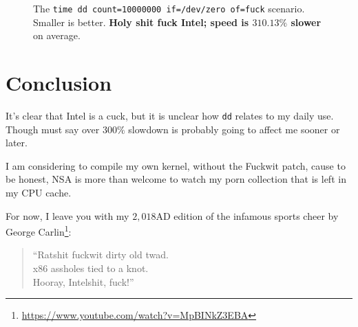 \documentclass[12pt,a4paper,onecolumn, openright]{article}
\begin{document}
\begin{figure}[h]
\centering
\caption{The \texttt{time dd count=10000000 if=/dev/zero of=fuck} scenario.
Smaller is better. \textbf{Holy shit fuck Intel; speed is
\underline{$310.13\%$} slower} on average.}
\end{figure}

\section{Conclusion}
It's clear that Intel is a cuck, but it is unclear how \texttt{dd} relates to
my daily use. Though must say over $300\%$ slowdown is probably going to affect
me sooner or later.

I am considering to compile my own kernel, without the Fuckwit patch, cause to
be honest, NSA is more than welcome to watch my porn collection that is left in
my CPU cache.

For now, I leave you with my $2,018$AD edition of the infamous sports cheer by
George Carlin\footnote{\url{https://www.youtube.com/watch?v=MpBINkZ3EBA}}:
\begin{quote}\centering
``Ratshit fuckwit dirty old twad.\\
x86 assholes tied to a knot.\\
Hooray, Intelshit, fuck!''
\end{quote}
\end{document}
